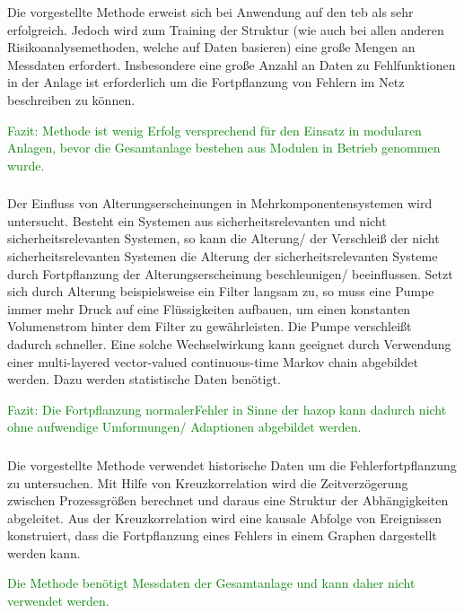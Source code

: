 Die vorgestellte Methode erweist sich bei Anwendung auf den \ac{teb} als sehr erfolgreich. Jedoch wird zum Training der Struktur (wie auch bei allen anderen Risikoanalysemethoden, welche auf Daten basieren) eine gro\ss{}e Mengen an Messdaten erfordert. Insbesondere eine gro\ss{}e Anzahl an Daten zu Fehlfunktionen in der Anlage ist erforderlich um die Fortpflanzung von Fehlern im Netz beschreiben zu k\"onnen.

\textcolor{green}{Fazit: Methode ist wenig Erfolg versprechend f\"ur den Einsatz in modularen Anlagen, bevor die Gesamtanlage bestehen aus Modulen in Betrieb genommen wurde.}

\subsubsection{\cite{Liang_2017}}Der Einfluss von Alterungserscheinungen in Mehrkomponentensystemen wird untersucht. Besteht ein Systemen aus sicherheitsrelevanten und nicht sicherheitsrelevanten Systemen, so kann die Alterung/ der Verschlei\ss{} der nicht sicherheitsrelevanten Systemen die Alterung der sicherheitsrelevanten Systeme durch Fortpflanzung der Alterungserscheinung beschleunigen/ beeinflussen. Setzt sich durch Alterung beispielsweise ein Filter langsam zu, so muss eine Pumpe immer mehr Druck auf eine Fl\"ussigkeiten aufbauen, um einen konstanten Volumenstrom hinter dem Filter zu gew\"ahrleisten. Die Pumpe verschlei\ss{}t dadurch schneller. Eine solche Wechselwirkung kann geeignet durch Verwendung einer multi-layered vector-valued continuous-time Markov chain abgebildet werden. Dazu werden statistische Daten ben\"otigt.

\textcolor{green}{Fazit: Die Fortpflanzung \glqq normaler\grqq { }Fehler in Sinne der \ac{hazop} kann dadurch nicht ohne aufwendige Umformungen/ Adaptionen abgebildet werden.} 

\subsubsection{\cite{Bauer_2008}}
Die vorgestellte Methode verwendet historische Daten um die Fehlerfortpflanzung zu untersuchen.  Mit Hilfe von Kreuzkorrelation wird die Zeitverz\"ogerung zwischen Prozessgr\"o\ss{}en berechnet und daraus eine Struktur der Abh\"angigkeiten abgeleitet. Aus der Kreuzkorrelation wird eine kausale Abfolge von Ereignissen konstruiert, dass die Fortpflanzung eines Fehlers in einem Graphen dargestellt werden kann. 

\textcolor{green}{Die Methode ben\"otigt Messdaten der Gesamtanlage und kann daher nicht verwendet werden.}

